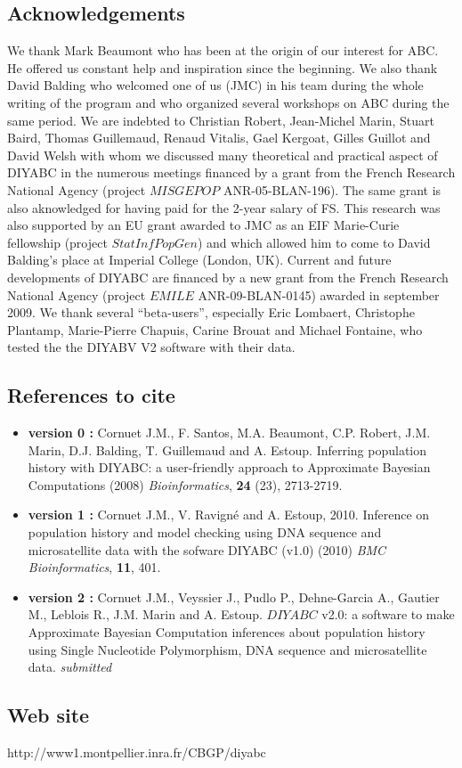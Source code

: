 \documentclass [a4paper]{report}
\let\subsectionv\subsection
\renewcommand{\subsection}[1]{\subsectionv{#1} \setcounter{paragraph}{0}}
\begin{document}
\subsection{Acknowledgements}
We thank Mark Beaumont who has been at the origin of our interest for ABC. He offered us constant help and inspiration since the beginning. We also thank David Balding who welcomed one of us (JMC) in his team during the whole writing of the program and who organized several workshops on ABC during the same period. We are indebted to Christian Robert, Jean-Michel Marin, Stuart Baird, Thomas Guillemaud, Renaud Vitalis, Gael Kergoat, Gilles Guillot and David Welsh with whom we discussed many theoretical and practical aspect of DIYABC in the numerous meetings financed by a grant from the French Research National Agency (project $MISGEPOP$ ANR-05-BLAN-196). The same grant is also aknowledged for having paid for the 2-year salary of FS. This research was also supported by an EU grant awarded to JMC as an EIF Marie-Curie fellowship (project $StatInfPopGen$) and which allowed him to come to David Balding's place at Imperial College (London, UK). Current and future developments of DIYABC are financed by a new grant from the French Research National Agency (project $EMILE$ ANR-09-BLAN-0145) awarded in september 2009. We thank several “beta-users”, especially Eric Lombaert, Christophe Plantamp, Marie-Pierre Chapuis, Carine Brouat and Michael Fontaine, who tested the the DIYABV V2 software with their data.
\subsection{References to cite}
\begin{itemize}
\item \textbf{version 0 :} Cornuet J.M., F. Santos, M.A. Beaumont, C.P. Robert, J.M. Marin, D.J. Balding, T. Guillemaud and A. Estoup. Inferring population history with DIYABC: a user-friendly approach to Approximate Bayesian Computations (2008) \emph{Bioinformatics}, \textbf{24} (23), 2713-2719.
\item  \textbf{version 1 :}  Cornuet J.M., V. Ravign\'e and A. Estoup, 2010. Inference on population history and model checking using DNA sequence and microsatellite data with the sofware DIYABC (v1.0) (2010) \emph{BMC Bioinformatics}, \textbf{11}, 401.
\item  \textbf{version 2 :}  Cornuet J.M., Veyssier J., Pudlo P., Dehne-Garcia A., Gautier M., Leblois R., J.M. Marin and A. Estoup. $DIYABC$ v2.0: a software to make Approximate Bayesian Computation inferences about population history using Single Nucleotide Polymorphism, DNA sequence and microsatellite data. \emph{submitted}
\end{itemize}
\subsection{Web site}
http://www1.montpellier.inra.fr/CBGP/diyabc\\



\newpage




\end{document}
